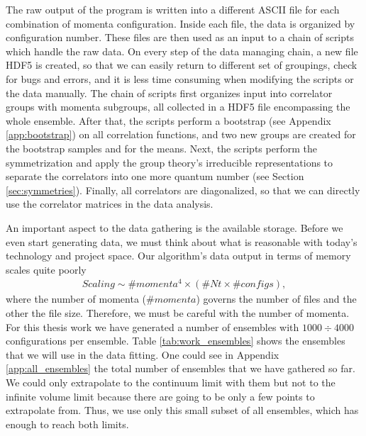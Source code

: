 The raw output of the program is written into a different ASCII file for each combination of momenta configuration. Inside each file, the data is organized by configuration number. These files are then used as an input to a chain of scripts which handle the raw data. On every step of the data managing chain, a new file HDF5 is created, so that we can easily return to different set of groupings, check for bugs and errors, and it is less time consuming when modifying the scripts or the data manually. The chain of scripts first organizes input into correlator groups with momenta subgroups, all collected in a HDF5 file encompassing the whole ensemble. After that, the scripts perform a bootstrap (see Appendix \ref{app:bootstrap}) on all correlation functions, and two new groups are created for the bootstrap samples and for the means. Next, the scripts perform the symmetrization and apply the group theory's irreducible representations to separate the correlators into one more quantum number (see Section \ref{sec:symmetries}). Finally, all correlators are diagonalized, so that we can directly use the correlator matrices in the data analysis.

An important aspect to the data gathering is the available storage. Before we even start generating data, we must think about what is reasonable with today's technology and project space. Our algorithm's data output in terms of memory scales quite poorly
\begin{equation}
    \begin{aligned}
        Scaling \sim \#momenta^{4} \times \left( \#Nt \times \#configs \right),
    \end{aligned}
\end{equation}
where the number of momenta ($\#momenta$) governs the number of files and the other the file size. Therefore, we must be careful with the number of momenta. For this thesis work we have generated a number of ensembles with $1000 \div  4000$ configurations per ensemble. Table \ref{tab:work_ensembles} shows the ensembles that we will use in the data fitting. One could see in Appendix \ref{app:all_ensembles} the total number of ensembles that we have gathered so far. We could only extrapolate to the continuum limit with them but not to the infinite volume limit because there are going to be only a few points to extrapolate from. Thus, we use only this small subset of all ensembles, which has enough to reach both limits.

